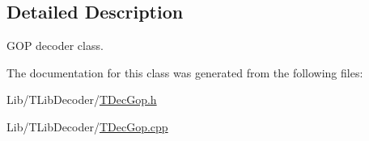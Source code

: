 


\subsection{Detailed Description}
G\+OP decoder class. 

The documentation for this class was generated from the following files\+:\begin{DoxyCompactItemize}
\item 
Lib/\+T\+Lib\+Decoder/\hyperlink{_t_dec_gop_8h}{T\+Dec\+Gop.\+h}\item 
Lib/\+T\+Lib\+Decoder/\hyperlink{_t_dec_gop_8cpp}{T\+Dec\+Gop.\+cpp}\end{DoxyCompactItemize}
